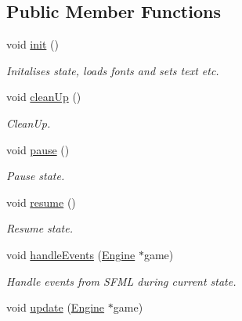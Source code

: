 \subsection*{Public Member Functions}
\begin{DoxyCompactItemize}
\item 
\hypertarget{class_intro_state_a2459946a323044d80bc028d568be56f1}{void \hyperlink{class_intro_state_a2459946a323044d80bc028d568be56f1}{init} ()}\label{class_intro_state_a2459946a323044d80bc028d568be56f1}

\begin{DoxyCompactList}\small\item\em Initalises state, loads fonts and sets text etc. \end{DoxyCompactList}\item 
\hypertarget{class_intro_state_a5871788ecfe3803c12577ee0e34ff96e}{void \hyperlink{class_intro_state_a5871788ecfe3803c12577ee0e34ff96e}{clean\-Up} ()}\label{class_intro_state_a5871788ecfe3803c12577ee0e34ff96e}

\begin{DoxyCompactList}\small\item\em Clean\-Up. \end{DoxyCompactList}\item 
\hypertarget{class_intro_state_a3f72570bb32e2638194cda8376429370}{void \hyperlink{class_intro_state_a3f72570bb32e2638194cda8376429370}{pause} ()}\label{class_intro_state_a3f72570bb32e2638194cda8376429370}

\begin{DoxyCompactList}\small\item\em Pause state. \end{DoxyCompactList}\item 
\hypertarget{class_intro_state_a52b9438fb45fbf7351629dfac9ada474}{void \hyperlink{class_intro_state_a52b9438fb45fbf7351629dfac9ada474}{resume} ()}\label{class_intro_state_a52b9438fb45fbf7351629dfac9ada474}

\begin{DoxyCompactList}\small\item\em Resume state. \end{DoxyCompactList}\item 
\hypertarget{class_intro_state_aee6ddc3d42199e13d5a3c7f35564759c}{void \hyperlink{class_intro_state_aee6ddc3d42199e13d5a3c7f35564759c}{handle\-Events} (\hyperlink{class_engine}{Engine} $\ast$game)}\label{class_intro_state_aee6ddc3d42199e13d5a3c7f35564759c}

\begin{DoxyCompactList}\small\item\em Handle events from S\-F\-M\-L during current state. \end{DoxyCompactList}\item 
\hypertarget{class_intro_state_a6b515a3287e51521a2e8925a1352171c}{void \hyperlink{class_intro_state_a6b515a3287e51521a2e8925a1352171c}{update} (\hyperlink{class_engine}{Engine} $\ast$game)}\label{class_intro_state_a6b515a3287e51521a2e8925a1352171c}


\end{DoxyCompactItemize}
